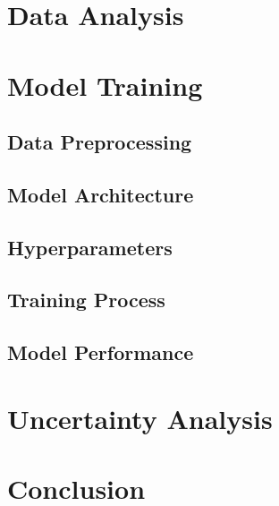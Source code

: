 \documentclass[a4paper]{article}
\begin{document}
\maketitle


\section{Data Analysis}

\section{Model Training}

\subsection{Data Preprocessing}


\subsection{Model Architecture}


\subsection{Hyperparameters}


\subsection{Training Process}


\subsection{Model Performance}


\section{Uncertainty Analysis}


\section{Conclusion}
\end{document}
